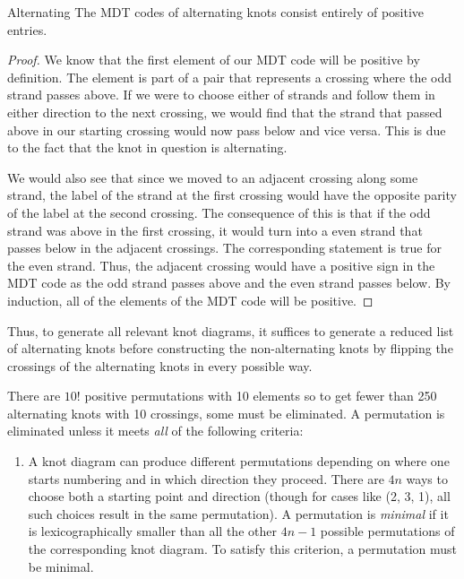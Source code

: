 \begin{paper}
\begin{paperclm}{Alternating}
{The MDT codes of alternating knots consist entirely of positive entries.}
\end{paperclm}

\begin{proof}
We know that the first element of our MDT code will be positive by definition.
The element is part of a pair that represents a crossing where the odd strand
passes above.
If we were to choose either of strands and follow them in either direction to
the next crossing, we would find that the strand that passed above in our
starting crossing would now pass below and vice versa.
This is due to the fact that the knot in question is alternating.

We would also see that since we moved to an adjacent crossing along some strand,
the label of the strand at the first crossing would have the opposite parity of
the label at the second crossing.
The consequence of this is that if the odd strand was above in the first
crossing, it would turn into a even strand that passes below in the adjacent
crossings.
The corresponding statement is true for the even strand.
Thus, the adjacent crossing would have a positive sign in the MDT code as the
odd strand passes above and the even strand passes below.
By induction, all of the elements of the MDT code will be positive.
\end{proof}

Thus, to generate all relevant knot diagrams, it suffices to generate a reduced
list of alternating knots before constructing the non-alternating knots by
flipping the crossings of the alternating knots in every possible way.

There are $10!$ positive permutations with 10 elements so to get fewer than 250
alternating knots with 10 crossings, some must be eliminated.
A permutation is eliminated unless it meets \textit{all} of the following
criteria:

\begin{enumerate}
\item A knot diagram can produce different permutations depending on where one
starts numbering and in which direction they proceed.
There are $4n$ ways to choose both a starting point and direction (though for
cases like (2, 3, 1), all such choices result in the same permutation).
A permutation is \textit{minimal} if it is lexicographically smaller than all
the other $4n-1$ possible permutations of the corresponding knot diagram.
To satisfy this criterion, a permutation must be minimal.


\end{enumerate}
\end{paper}
